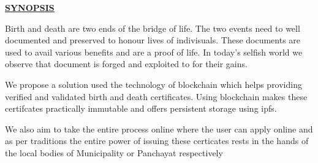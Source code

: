 
\begin{center}
    \underline{\bfseries \huge SYNOPSIS}\\
    \vspace{1cm}
    \end{center}
    Birth and death are two ends of the bridge of life. The two events need to well documented and preserved to honour lives of indivisuals. These documents are used to avail various benefits and are  a proof of life. In today's selfish world we observe that document is forged and exploited to for their gains. \newline



    We propose a solution used the technology of blockchain which helps providing verified and validated birth and death certificates. Using blockchain makes these certifcates practically immutable and offers persistent storage using ipfs.\newline
    
    We also aim to take the entire process online where the user can apply online and as per traditions the entire power of issuing these certicates rests in the hands of the local bodies of Municipality or Panchayat respectively
    
